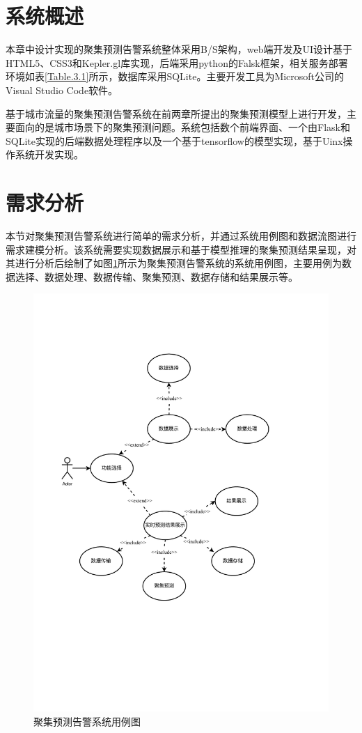 \documentclass[master]{thesis-uestc}
\begin{document}
\section{系统概述}
本章中设计实现的聚集预测告警系统整体采用B/S架构，web端开发及UI设计基于HTML5、CSS3和Kepler.gl库实现，后端采用python的Falsk框架，相关服务部署环境如表\ref{Table.3.1}所示，数据库采用SQLite。主要开发工具为Microsoft公司的Visual Studio Code软件。

基于城市流量的聚集预测告警系统在前两章所提出的聚集预测模型上进行开发，主要面向的是城市场景下的聚集预测问题。系统包括数个前端界面、一个由Flask和SQLite实现的后端数据处理程序以及一个基于tensorflow的模型实现，基于Uinx操作系统开发实现。

\section{需求分析}
本节对聚集预测告警系统进行简单的需求分析，并通过系统用例图和数据流图进行需求建模分析。该系统需要实现数据展示和基于模型推理的聚集预测结果呈现，对其进行分析后绘制了如图\ref{Figure.5.1}所示为聚集预测告警系统的系统用例图，主要用例为数据选择、数据处理、数据传输、聚集预测、数据存储和结果展示等。
\begin{figure}[!ht]
\centering
\includegraphics[scale=0.7]{./pic/用例图.pdf}
\caption{聚集预测告警系统用例图}
\label{Figure.5.1}
\end{figure}
\end{document}
